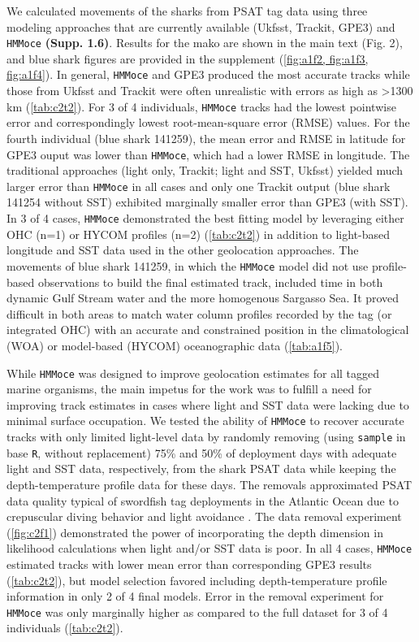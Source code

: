 We calculated movements of the sharks from PSAT tag data using three
modeling approaches that are currently available (Ukfsst, Trackit, GPE3)
and \texttt{HMMoce} \textbf{(Supp. 1.6)}. Results for the mako are shown in the
main text (Fig. 2), and blue shark figures are
provided in the supplement (\cref{fig:a1f2, fig:a1f3, fig:a1f4}). In general,
\texttt{HMMoce} and GPE3 produced the most accurate tracks while those
from Ukfsst and Trackit were often unrealistic with errors as high as
\textgreater{}1300 km (\cref{tab:c2t2}). For 3 of 4 individuals, \texttt{HMMoce}
tracks had the lowest pointwise error and correspondingly lowest
root-mean-square error (RMSE) values. For the fourth individual (blue
shark 141259), the mean error and RMSE in latitude for GPE3 ouput was
lower than \texttt{HMMoce}, which had a lower RMSE in longitude. The
traditional approaches (light only, Trackit; light and SST, Ukfsst)
yielded much larger error than \texttt{HMMoce} in all cases and only one
Trackit output (blue shark 141254 without SST) exhibited marginally
smaller error than GPE3 (with SST). In 3 of 4 cases, \texttt{HMMoce}
demonstrated the best fitting model by leveraging either OHC (n=1) or
HYCOM profiles (n=2) (\cref{tab:c2t2}) in addition to light-based longitude and
SST data used in the other geolocation approaches. The movements of blue
shark 141259, in which the \texttt{HMMoce} model did not use
profile-based observations to build the final estimated track, included
time in both dynamic Gulf Stream water and the more homogenous Sargasso
Sea. It proved difficult in both areas to match water column profiles
recorded by the tag (or integrated OHC) with an accurate and constrained
position in the climatological (WOA) or model-based (HYCOM)
oceanographic data (\cref{tab:a1f5}).

While \texttt{HMMoce} was designed to improve geolocation estimates for
all tagged marine organisms, the main impetus for the work was to
fulfill a need for improving track estimates in cases where light and
SST data were lacking due to minimal surface occupation. We tested the
ability of \texttt{HMMoce} to recover accurate tracks with only limited
light-level data by randomly removing (using \texttt{sample} in base
\texttt{R}, without replacement) 75\% and 50\% of deployment days with
adequate light and SST data, respectively, from the shark PSAT data
while keeping the depth-temperature profile data for these days. The
removals approximated PSAT data quality typical of swordfish tag
deployments in the Atlantic Ocean due to crepuscular diving behavior and
light avoidance \citep{Braun2015, Neilson2009}. The data removal
experiment (\cref{fig:c2f1}) demonstrated the power of incorporating
the depth dimension in likelihood calculations when light and/or SST
data is poor. In all 4 cases, \texttt{HMMoce} estimated tracks with
lower mean error than corresponding GPE3 results (\cref{tab:c2t2}), but model
selection favored including depth-temperature profile information in
only 2 of 4 final models. Error in the removal experiment for
\texttt{HMMoce} was only marginally higher as compared to the full
dataset for 3 of 4 individuals (\cref{tab:c2t2}).

